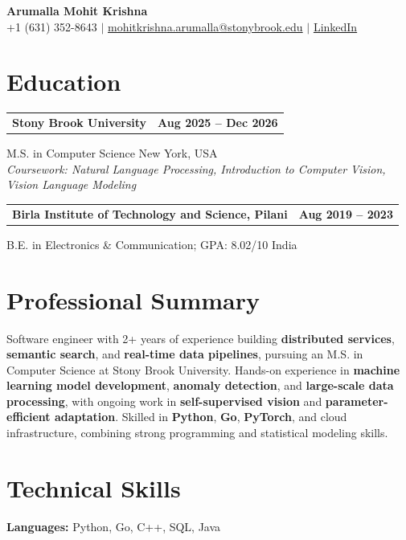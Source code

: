 \documentclass[letterpaper,10pt]{article}
\makeatletter
\newcommand{\entry}[2]{%
  \noindent
  \begin{tabularx}{\linewidth}
    {@{}>{\raggedright\arraybackslash}X@{\hspace{6pt}}r@{}}
    \textbf{#1} & #2
  \end{tabularx}\par
}
\makeatother
\begin{document}
\begin{center}
    {\LARGE\bfseries Arumalla Mohit Krishna}\\[3pt]
    +1 (631) 352-8643 $|$
    \href{mailto:mohitkrishna.arumalla@stonybrook.edu}
    {mohitkrishna.arumalla@stonybrook.edu} $|$
    \href{https://linkedin.com/in/mohit-krishna-arumalla}
    {LinkedIn}
\end{center}
\vspace{-8pt}

\section{Education}

\entry
  {\textbf{Stony Brook University}}
  {\textbf{Aug 2025 -- Dec 2026}}

M.S. in Computer Science \hfill New York, USA\\
\textit{
Coursework: Natural Language Processing,
Introduction to Computer Vision, Vision Language Modeling
}
\vspace{3pt}

\entry
  {\textbf{Birla Institute of Technology and Science, Pilani}}
  {\textbf{Aug 2019 -- 2023}}

B.E. in Electronics \& Communication; GPA: 8.02/10 \hfill India
\section{Professional Summary}

Software engineer with 2+ years of experience building \textbf{distributed services}, \textbf{semantic search}, and \textbf{real-time data pipelines}, pursuing an M.S. in Computer Science at Stony Brook University. Hands-on experience in \textbf{machine learning model development}, \textbf{anomaly detection}, and \textbf{large-scale data processing}, with ongoing work in \textbf{self-supervised vision} and \textbf{parameter-efficient adaptation}. Skilled in \textbf{Python}, \textbf{Go}, \textbf{PyTorch}, and cloud infrastructure, combining strong programming and statistical modeling skills.

\section{Technical Skills}

\textbf{Languages:}
Python, Go, C++, SQL, Java\\
\end{document}
